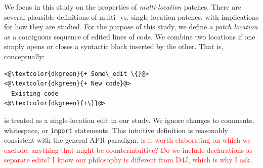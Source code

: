 \documentclass[10pt, conference]{IEEEtran}
\newcommand\todo[1]{\textcolor{red}{#1}}
\begin{document}
We focus in this study on the properties of \emph{multi-location} patches. There are
several plausible definitions of multi- vs. single-location patches, with
implications for how they are studied. For the purpose of this study, we define
a \emph{patch location} as a contiguous sequence of edited lines of code.  We
combine two locations if one simply opens or closes a syntactic block inserted
by the other. That is, conceptually:
\begin{lstlisting}[style=examplestyle]
<@\textcolor{dkgreen}{+ Some\_edit \{}@>
<@\textcolor{dkgreen}{+ New code}@>
  Existing code
<@\textcolor{dkgreen}{+\}}@>
\end{lstlisting}
is treated as a single-location edit in our study. We ignore changes to
comments, whitespace, or \texttt{import} statements.
%
This intuitive definition is reasonably consistent with the general APR
paradigm. 
\todo{is it worth elaborating on which we exclude, anything that might be
  counterintuitive? Do we include declarations as separate edits? I know our
  philosophy is different from D4J, which is why I ask.}
\end{document}
